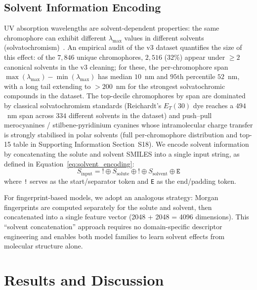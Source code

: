 \documentclass[journal=jcisd8,manuscript=article]{achemso}
\newcommand{\added}[1]{{\color{addedblue}#1}}
\begin{document}
\subsection{Solvent Information Encoding}
\label{sec:solvent}

UV absorption wavelengths are solvent-dependent properties: the same chromophore can exhibit different $\lambda_{\max}$ values in different solvents (solvatochromism)~\cite{reichardt2011solvents}.\added{ An empirical audit of the v3 dataset quantifies the size of this effect: of the $7{,}846$ unique chromophores, $2{,}516$ ($32$\%) appear under $\geq 2$ canonical solvents in the v3 cleaning; for these, the per-chromophore span $\max(\lambda_{\max}) - \min(\lambda_{\max})$ has median $10$~nm and $95$th percentile $52$~nm, with a long tail extending to $> 200$~nm for the strongest solvatochromic compounds in the dataset. The top-decile chromophores by span are dominated by classical solvatochromism standards (Reichardt's $E_T(30)$ dye reaches a $494$~nm span across $334$ different solvents in the dataset) and push--pull merocyanines / stilbene-pyridinium cyanines whose intramolecular charge transfer is strongly stabilised in polar solvents (full per-chromophore distribution and top-15 table in Supporting Information Section~S18).}
We encode solvent information by concatenating the solute and solvent SMILES into a single input string\added{, as defined in Equation~\ref{eq:solvent_encoding}}:
\begin{equation}
\label{eq:solvent_encoding}
 S_{\text{input}} = \texttt{!} \oplus S_{\text{solute}} \oplus \texttt{!} \oplus S_{\text{solvent}} \oplus \texttt{E}
\end{equation}
where \texttt{!} serves as the start/separator token and \texttt{E} as the end/padding token.

For fingerprint-based models, we adopt an analogous strategy: Morgan fingerprints are computed separately for the solute and solvent, then concatenated into a single feature vector (2048 + 2048 = 4096 dimensions).
This ``solvent concatenation'' approach requires no domain-specific descriptor engineering and enables both model families to learn solvent effects from molecular structure alone.


\section{Results and Discussion}
\label{sec:results}

\end{document}
